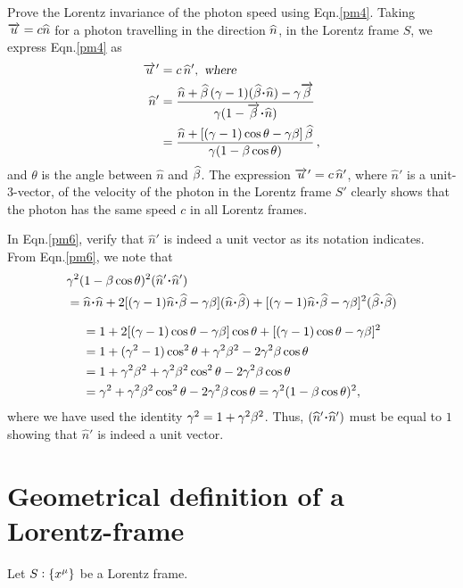 \exm Prove the Lorentz invariance of the photon speed 
using 
Eqn.\eqref{pm4}.
\soln Taking $\overrightarrow{u}=c{\widehat{n}}$ for a photon 
travelling in 
the direction ${\widehat{n}}$, in the Lorentz frame $S$, we 
express Eqn.\eqref{pm4} as
\begin{align}\label{pm6}
\pvec{u}&=c\,\hat{n}', \textsl{ where }\notag\\
\hat{n}' &=\frac{\hat{n}+ \hat{\gkb}\,(\gkg-1)  
(\hat{\gkb}\dotp\hat{n}) -\gkg\veca{\gkb}} 
{\gkg (1-\veca{\gkb}\dotp \hat{n})}\notag\\
&=\frac{\hat{n} +[(\gkg-1) \cos\theta
-\gkg\gkb]\,\hat{\gkb}} {\gkg (1-\gkb\cos\theta)}\,,
\end{align}
and $\theta$ is the angle between $\hat{n}$ and 
${\widehat{{\beta}}}$. The expression ${\overrightarrow{u}\hspace*{.3pt}'}=c\,{\widehat{n}}'$, 
where $\hat{n}'$ is a unit-3-vector, of the 
velocity of the photon in the Lorentz frame $S'$ 
clearly 
shows that {the photon has the same speed $c$ in all 
Lorentz frames}.\ebx

\exm  In Eqn.\eqref{pm6}, verify that  $\hat{n}'$ is 
indeed 
a unit vector as its notation indicates.
\soln From  Eqn.\eqref{pm6}, we note that
\begin{align*}
&\gkg^2 (1-\gkb\cos\theta)^2 
(\hat{n}'\dotp\hat{n}')\\
&= \hat{n}\dotp\hat{n}+2[(\gkg-1)\hat{n}\dotp 
\hat{\gkb} -\gkg\gkb] (\hat{n}\dotp\hat{\gkb}) 
+[(\gkg-1)\hat{n}\dotp\hat{\gkb} -\gkg\gkb]^2 
(\hat{\gkb}\dotp\hat{\gkb})
\end{align*}

\begin{align*}
&=1+2[({\gamma}-1)\cos\theta-{\gamma}{\beta}] \cos\theta 
+[({\gamma}-1)\cos\theta -{\gamma}{\beta}]^2\\
&=1+({\gamma}^2-1)\cos^2\theta+{\gamma}^2{\beta}^2 -2
{\gamma}^2 {\beta}\cos\theta\\
&=1+{\gamma}^2{\beta}^2+{\gamma}^2{\beta}^2\cos^2\theta-
2 {\gamma}^2  {\beta}\cos\theta \\&={\gamma}^2
+{\gamma}^2{\beta}^2\cos^2\theta 
-2 {\gamma}^2 {\beta}\cos\theta={\gamma}^2(1-{\beta}\cos\theta)^2,
\end{align*}
where we have used the identity ${\gamma}^2 
=1+{\gamma}^2{\beta}^2$. Thus,  $(\hat{n}' \dotp \hat{n}')$ 
must be equal to $1$ showing that $\hat{n}'$ is indeed 
a 
unit vector. 

\section{Geometrical definition of a\\ Lorentz-frame}
Let $S:\{x^{{\mu}}\}$ be a Lorentz frame. 

